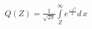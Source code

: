 \documentclass[20pt]{report}
\begin{document}
\begin{center}
\(
Q(Z)=\frac{1}{\sqrt{2\pi }}\int\limits_{Z}^{\infty }e^{\frac{-x^{2}}{2}}d\,x
\)
\end{center}
\end{document}
